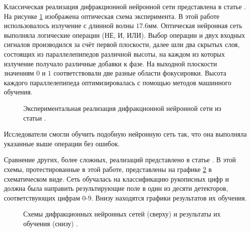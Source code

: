 \FloatBarrier\par
Классическая реализация дифракционной нейронной сети представлена в статье \cite{qian2020performing}. На рисунке \ref{ris:ClassicD2NN} изображена оптическая схема эксперимента. В этой работе использовалось излучение с длинной волны $17.6$мм. Оптическая нейронная сеть выполняла логические операции (НЕ, И, ИЛИ). Выбор операции и двух входных сигналов производился за счёт первой плоскости, далее шли два скрытых слоя, состоящих из параллелепипедов различной высоты, на каждом из которых излучение получало различные добавки к фазе. На выходной плоскости значениям $0$ и $1$ соответствовали две разные области фокусировки. Высота каждого параллелепипеда оптимизировалась с помощью методов машинного обучения. 
\begin{figure}[h]
	\caption{Экспериментальная реализация дифракционной нейронной сети из статьи \cite{qian2020performing}.}
	\label{ris:ClassicD2NN}
\end{figure}
Исследователи смогли обучить подобную нейронную сеть так, что она выполняла указанные выше операции без ошибок.

\FloatBarrier\par
Сравнение других, более сложных, реализаций представлено в статье \cite{yan2019fourier}. В этой схемы, протестированные в этой работе, представлены на графике \ref{ris:FD2NN} в схематическом виде. Сеть обучалась на классификацию рукописных цифр и должна была направить результирующие поле в один из десяти детекторов, соответствующих цифрам $0$-$9$. Внизу находятся графики результатов их обучения.
\begin{figure}[h]
	\caption{Схемы дифракционных нейронных сетей (сверху) и результаты их обучения (снизу) \cite{yan2019fourier}.}
	\label{ris:FD2NN}
\end{figure}






